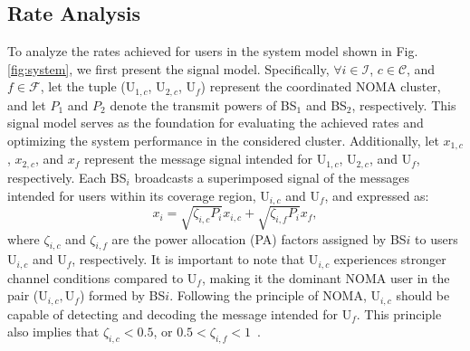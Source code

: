 \documentclass[conference]{IEEEtran}
\begin{document}
\subsection{Rate Analysis}
To analyze the rates achieved for users in the system model shown in Fig. \ref{fig:system}, we first present the signal model. Specifically, $\forall i \in \mathcal{I}$, $c \in \mathcal{C}$, and $f \in \mathcal{F}$, let the tuple (U$_{1,c}$, U$_{2,c}$, U$_f$) represent the coordinated NOMA cluster, and let $P_1$ and $P_2$ denote the transmit powers of BS$_1$ and BS$_2$, respectively. This signal model serves as the foundation for evaluating the achieved rates and optimizing the system performance in the considered cluster. Additionally, let $x_{1,c}$, $x_{2,c}$, and $x_f$ represent the message signal intended for U$_{1,c}$, U$_{2,c}$, and U$_f$, respectively. Each BS$_i$ broadcasts a superimposed signal of the messages~\cite{saito2013non} intended for users within its coverage region, U$_{i,c}$ and U$_f$, and expressed as:
\begin{equation}
    x_{i}=\sqrt{\zeta_{i,c}P_i}x_{i,c} + \sqrt{\zeta_{i,f}P_i}x_f,
\end{equation}
where $\zeta_{i,c}$ and $\zeta_{i,f}$ are the power allocation (PA) factors assigned by BS$i$ to users U$_{i,c}$ and U$_f$, respectively. It is important to note that U$_{i,c}$ experiences stronger channel conditions compared to U$_f$, making it the dominant NOMA user in the pair ($\text{U}_{i,c}, \text{U}_f$) formed by BS$i$. Following the principle of NOMA, U$_{i,c}$ should be capable of detecting and decoding the message intended for U$_f$. This principle also implies that $\zeta_{i,c} < 0.5$, or $0.5 < \zeta_{i,f} < 1$~\cite{obeed2020user, salem2020noma}.
\end{document}
